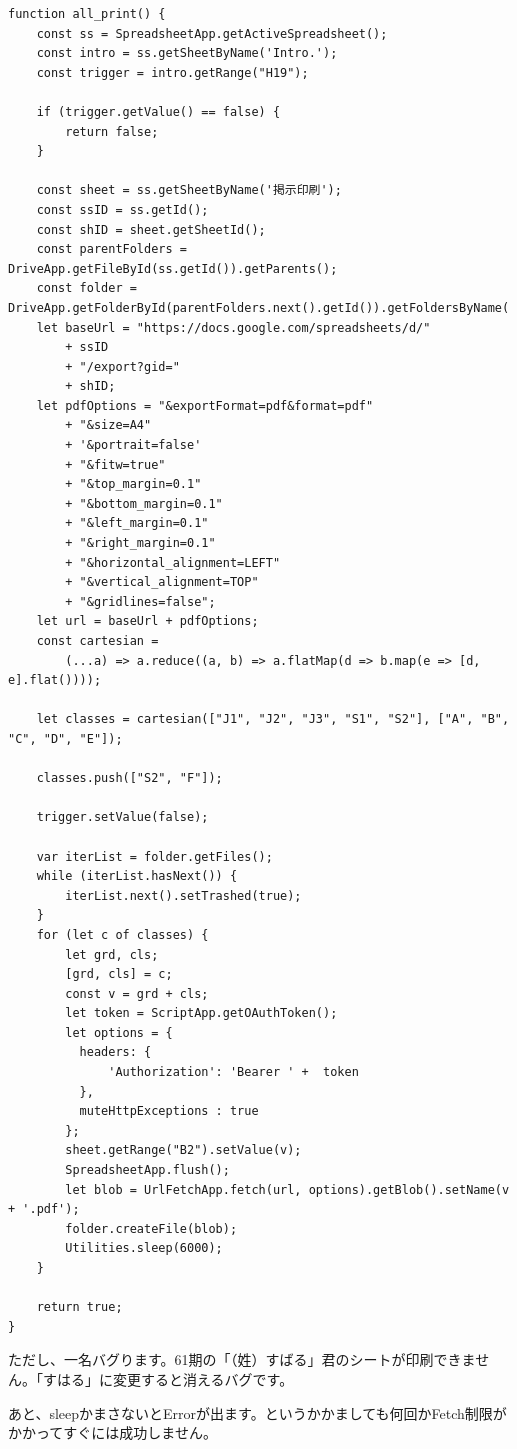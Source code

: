 \documentclass[dvipdfmx,jb5]{jreport}
\begin{document}
\begin{lstlisting}
function all_print() {
    const ss = SpreadsheetApp.getActiveSpreadsheet();
    const intro = ss.getSheetByName('Intro.');
    const trigger = intro.getRange("H19");

    if (trigger.getValue() == false) {
        return false;
    }

    const sheet = ss.getSheetByName('掲示印刷');
    const ssID = ss.getId();
    const shID = sheet.getSheetId();
    const parentFolders = DriveApp.getFileById(ss.getId()).getParents();
    const folder = DriveApp.getFolderById(parentFolders.next().getId()).getFoldersByName('pdf').next();
    let baseUrl = "https://docs.google.com/spreadsheets/d/"
        + ssID
        + "/export?gid="
        + shID;
    let pdfOptions = "&exportFormat=pdf&format=pdf"
        + "&size=A4"
        + '&portrait=false'
        + "&fitw=true"
        + "&top_margin=0.1"
        + "&bottom_margin=0.1"
        + "&left_margin=0.1"
        + "&right_margin=0.1"
        + "&horizontal_alignment=LEFT"
        + "&vertical_alignment=TOP"
        + "&gridlines=false";
    let url = baseUrl + pdfOptions;
    const cartesian =
        (...a) => a.reduce((a, b) => a.flatMap(d => b.map(e => [d, e].flat())));

    let classes = cartesian(["J1", "J2", "J3", "S1", "S2"], ["A", "B", "C", "D", "E"]);

    classes.push(["S2", "F"]);

    trigger.setValue(false);

    var iterList = folder.getFiles();
    while (iterList.hasNext()) {
        iterList.next().setTrashed(true);
    }
    for (let c of classes) {
        let grd, cls;
        [grd, cls] = c;
        const v = grd + cls;
        let token = ScriptApp.getOAuthToken();
        let options = {
          headers: {
              'Authorization': 'Bearer ' +  token
          },
          muteHttpExceptions : true
        };
        sheet.getRange("B2").setValue(v);
        SpreadsheetApp.flush();
        let blob = UrlFetchApp.fetch(url, options).getBlob().setName(v + '.pdf');
        folder.createFile(blob);
        Utilities.sleep(6000);
    }

    return true;
}
\end{lstlisting}

ただし、一名バグります。61期の「（姓）すばる」君のシートが印刷できません。「すはる」に変更すると消えるバグです。

あと、sleepかまさないとErrorが出ます。というかかましても何回かFetch制限がかかってすぐには成功しません。
\end{document}
